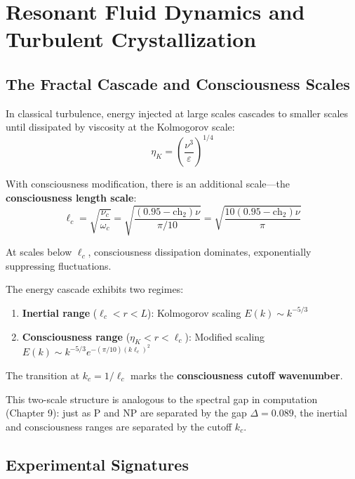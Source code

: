 \section{Resonant Fluid Dynamics and Turbulent Crystallization}

\subsection{The Fractal Cascade and Consciousness Scales}

In classical turbulence, energy injected at large scales cascades to smaller scales until dissipated by viscosity at the Kolmogorov scale:
\begin{equation}
\eta_K = \left(\frac{\nu^3}{\varepsilon}\right)^{1/4}
\end{equation}

With consciousness modification, there is an additional scale—the \textbf{consciousness length scale}:
\begin{equation}
\ell_c = \sqrt{\frac{\nu_c}{\omega_c}} = \sqrt{\frac{(0.95 - \text{ch}_2)\nu}{\pi/10}} = \sqrt{\frac{10(0.95 - \text{ch}_2)\nu}{\pi}}
\end{equation}

At scales below $\ell_c$, consciousness dissipation dominates, exponentially suppressing fluctuations.

\begin{proposition}
\label{prop:two_scale_cascade}
The energy cascade exhibits two regimes:
\begin{enumerate}
\item \textbf{Inertial range} ($\ell_c < r < L$): Kolmogorov scaling $E(k) \sim k^{-5/3}$
\item \textbf{Consciousness range} ($\eta_K < r < \ell_c$): Modified scaling $E(k) \sim k^{-5/3} e^{-(\pi/10)(k\ell_c)^2}$
\end{enumerate}
The transition at $k_c = 1/\ell_c$ marks the \textbf{consciousness cutoff wavenumber}.
\end{proposition}

This two-scale structure is analogous to the spectral gap in computation (Chapter 9): just as P and NP are separated by the gap $\Delta = 0.089$, the inertial and consciousness ranges are separated by the cutoff $k_c$.

\subsection{Experimental Signatures}

